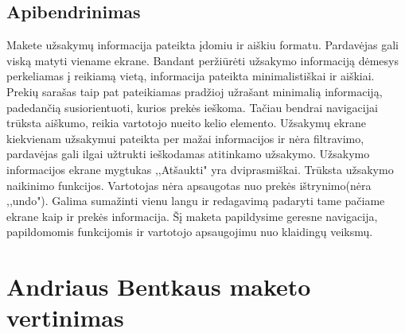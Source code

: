 \documentclass[oneside]{VUMIFPSkursinis}
\begin{document}
	\subsection{Apibendrinimas}
Makete užsakymų informacija pateikta įdomiu ir aiškiu formatu. Pardavėjas gali viską matyti viename ekrane. Bandant peržiūrėti užsakymo informaciją dėmesys perkeliamas į reikiamą vietą, informacija pateikta minimalistiškai ir aiškiai. Prekių sarašas taip pat pateikiamas pradžioj užrašant minimalią informaciją, padedančią susiorientuoti, kurios prekės ieškoma. Tačiau bendrai navigacijai trūksta aiškumo, reikia vartotojo nueito kelio elemento. Užsakymų ekrane kiekvienam užsakymui pateikta per mažai informacijos ir nėra filtravimo, pardavėjas gali ilgai užtrukti ieškodamas atitinkamo užsakymo. Užsakymo informacijos ekrane mygtukas ,,Atšaukti" yra dviprasmiškai. Trūksta užsakymo naikinimo funkcijos. Vartotojas nėra apsaugotas nuo prekės ištrynimo(nėra ,,undo"). Galima sumažinti vienu langu ir redagavimą padaryti tame pačiame ekrane kaip ir prekės informacija. Šį maketa papildysime geresne navigacija, papildomomis funkcijomis ir vartotojo apsaugojimu nuo klaidingų veiksmų.


\iffalse XXXXXXXXXXXXXXXXXXXXXXXXXXXXXXXXXXXXXXXXXXXXXXXXXXXXXXXXXXXXXXXXXXXXXXXXXXXXXXXXXXXXXXXXXXXXXXXXXXXXXXXXXXXXXXXXXXXXXXXXXXXXXXXXXXXXXXX \fi

\section{Andriaus Bentkaus maketo vertinimas}
\end{document}
